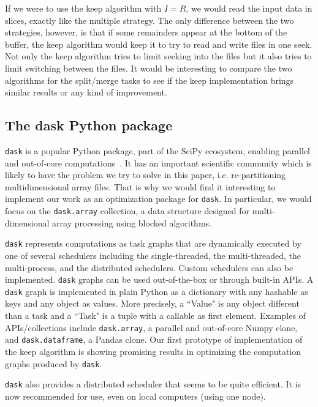 \documentclass[sigconf, nonacm]{acmart}
\begin{document}
If we were to use the keep algorithm with $I=R$, we would read the input data
in slices, exactly like the multiple strategy. The only difference between the
two strategies, however, is that if some remainders appear at the bottom of the
buffer, the keep algorithm would keep it to try to read and write files in one
seek. Not only the keep algorithm tries to limit seeking into the files but it
also tries to limit switching between the files. It would be interesting to
compare the two algorithms for the split/merge tasks to see if the keep
implementation brings similar results or any kind of improvement.

\subsection{The dask Python package}
\texttt{dask} is a popular Python package, part of the SciPy ecosystem, enabling
parallel and out-of-core computations~\cite{matthew_rocklin-proc-scipy-2015}.
It has an important scientific community which is likely to have the problem we
try to solve in this paper, i.e. re-partitioning multidimensional array files.
That is why we would find it interesting to implement our work as an optimization
package for \texttt{dask}.
In particular, we would focus on the \texttt{dask.array} collection, a data
structure designed for multi-dimensional array processing using blocked
algorithms.

\texttt{dask} represents computations as task graphs that are dynamically executed by one
of several schedulers including the single-threaded, the multi-threaded, the
multi-process, and the distributed schedulers. Custom schedulers can also be
implemented. \texttt{dask} graphs can be used out-of-the-box or through
built-in APIs. A \texttt{dask} graph is implemented in plain Python as a
dictionary with any hashable as keys and any object as values. More precisely,
a ``Value" is any object different than a task and a ``Task" is a tuple with a
callable as first element. Examples of APIs/collections include
\texttt{dask.array}, a parallel and out-of-core
Numpy clone, and \texttt{dask.dataframe}, a Pandas clone.
Our first prototype of implementation of the keep algorithm is showing promising
results in optimizing the computation graphs produced by \texttt{dask}.

\texttt{dask} also provides a distributed scheduler that seems to be quite
efficient.
It is now recommended for use, even on local computers (using one node).
\end{document}
